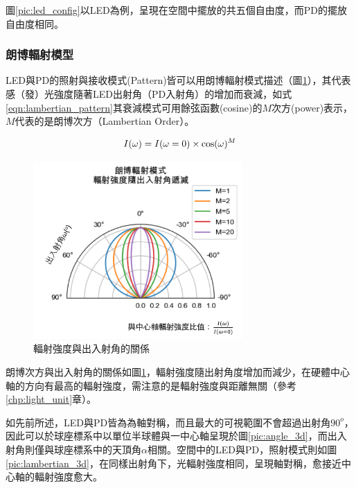         \qquad
        圖\ref{pic:led_config}以LED為例，呈現在空間中擺放的共五個自由度，而PD的擺放自由度相同。
        
        \subsubsection{朗博輻射模型}
        \label{chp:lambertian}

        

        LED與PD的照射與接收模式(Pattern)皆可以用朗博輻射模式描述（圖\ref{pic:lambertian}），其代表感（發）光強度隨著LED出射角（PD入射角）的增加而衰減，如式\ref{eqn:lambertian_pattern}其衰減模式可用餘弦函數(cosine)的$M$次方(power)表示，$M$代表的是朗博次方（Lambertian Order）。

        \begin{equation}
            \label{eqn:lambertian_pattern}
            I(\omega)=I(\omega=0)\times\cos(\omega)^{M}\\
        \end{equation}

        \begin{figure}[ht]
            \centering
            \includegraphics[width=8cm]{ch2pic/lambertian.png}
            \caption{輻射強度與出入射角的關係}
            \label{pic:lambertian}
        \end{figure}

        朗博次方與出入射角的關係如圖\ref{pic:lambertian}，輻射強度隨出射角度增加而減少，在硬體中心軸的方向有最高的輻射強度，需注意的是輻射強度與距離無關（參考\ref{chp:light_unit}章）。
        
        如先前所述，LED與PD皆為為軸對稱，而且最大的可視範圍不會超過出射角$90^{o}$，因此可以於球座標系中以單位半球體與一中心軸呈現於圖\ref{pic:angle_3d}，而出入射角則僅與球座標系中的天頂角$\alpha$相關。空間中的LED與PD，照射模式則如圖\ref{pic:lambertian_3d}，在同樣出射角下，光輻射強度相同，呈現軸對稱，愈接近中心軸的輻射強度愈大。

